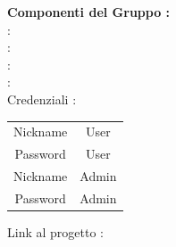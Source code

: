 \documentclass[12pt, a4paper,table]{article}
\begin{document}
\begin{center}
		\vspace{2em}
		\textbf{Componenti del Gruppo :}
		\vspace{0.5em}
		\\ \Tber : \MatT
		\vspace{0.5em}
		\\ \Mspa : \MatM
		\vspace{0.5em}
		\\ \Plau : \MatP
		\vspace{0.5em}
		\\ \Amat : \MatA
    \vspace{0.5em}
    \\ Credenziali :
    \begin{center}
      \begin{tabular}{ |c|c| } 
      \hline
      Nickname & User \\ 
      Password & User \\ 
      \hline
      Nickname & Admin \\ 
      Password & Admin \\
      \hline
      \end{tabular}
    \end{center}
    \vspace{0.5em}
    Link al progetto : 

    
	\end{center}

  \newpage
  \tableofcontents

	\newpage
	
	
	\newpage
	
		
	
	
	
	
	
	
	
	
	

  
\end{document}
